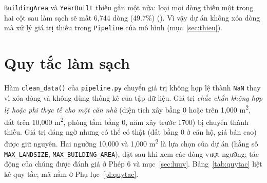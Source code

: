 \texttt{BuildingArea} và \texttt{YearBuilt} thiếu gần một nửa: loại mọi dòng thiếu một trong hai cột sau làm sạch sẽ mất 6,744 dòng (49.7\%) (). Vì vậy dự án không xóa dòng mà xử lý giá trị thiếu trong \texttt{Pipeline} của mô hình (mục~\ref{sec:thieu}).

\section{Quy tắc làm sạch}\label{sec:quytac}
Hàm \texttt{clean\_data()} của \texttt{pipeline.py} chuyển giá trị không hợp lệ thành \texttt{NaN} thay vì xóa dòng và không dùng thống kê của tập dữ liệu. Giá trị \emph{chắc chắn không hợp lệ hoặc phi thực tế cho một căn nhà} (diện tích xây bằng 0 hoặc trên 1,000 m\textsuperscript{2}, đất trên 10,000 m\textsuperscript{2}, phòng tắm bằng 0, năm xây trước 1700) bị chuyển thành thiếu. Giá trị đáng ngờ nhưng có thể có thật (đất bằng 0 ở căn hộ, giá bán cao) được giữ nguyên. Hai ngưỡng 10,000 và 1,000 m\textsuperscript{2} là lựa chọn của dự án (hằng số \texttt{MAX\_LANDSIZE}, \texttt{MAX\_BUILDING\_AREA}), đặt sau khi xem các dòng vượt ngưỡng; tác động của chúng được đánh giá ở Phép 6 và mục~\ref{sec:luuy}. Bảng~\ref{tab:quytac} liệt kê quy tắc; mã nằm ở Phụ lục~\ref{pl:quytac}.

